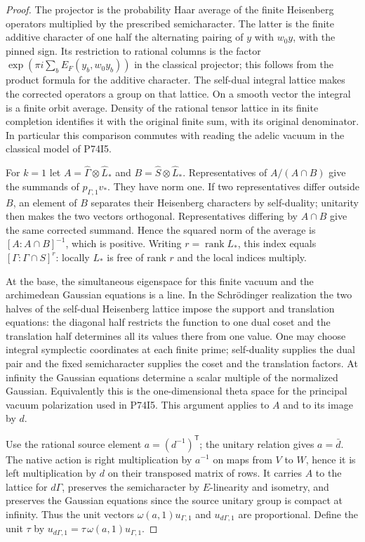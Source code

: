 \begin{proof}
The projector is the probability Haar average of the finite
Heisenberg operators multiplied by the prescribed semicharacter.
The latter is the finite additive character of one half the
alternating pairing of $y$ with $w_0 y$, with the pinned sign.
Its restriction to rational columns is the factor
$\exp(\pi i\sum_b E_F(y_b,w_0 y_b))$ in the classical projector;
this follows from the product formula for the additive character.
The self-dual integral lattice makes the corrected operators a
group on that lattice. On a smooth vector the integral is a finite
orbit average. Density of the rational tensor lattice in its finite
completion identifies it with the original finite sum, with its
original denominator. In particular this comparison commutes with
reading the adelic vacuum in the classical model of P74I5.

For $k=1$ let $A=\widehat\Gamma\otimes\widehat L_*$ and
$B=\widehat S\otimes\widehat L_*$. Representatives of
$A/(A\cap B)$ give the summands of $p_{\Gamma,1}v_*$. They
have norm one. If two representatives differ outside $B$, an
element of $B$ separates their Heisenberg characters by self-duality;
unitarity then makes the two vectors orthogonal. Representatives
differing by $A\cap B$ give the same corrected summand. Hence the
squared norm of the average is $[A:A\cap B]^{-1}$, which is
positive. Writing $r=\operatorname{rank} L_*$, this index equals
$[\Gamma:\Gamma\cap S]^r$: locally $L_*$ is free of rank $r$
and the local indices multiply.

At the base, the simultaneous eigenspace for this finite vacuum
and the archimedean Gaussian equations is a line. In the
Schr\"odinger realization the two halves of the self-dual
Heisenberg lattice impose the support and translation equations:
the diagonal half restricts the function to one dual coset and
the translation half determines all its values there from one
value. One may choose integral symplectic coordinates at each
finite prime; self-duality supplies the dual pair and the fixed
semicharacter supplies the coset and the translation factors.
At infinity the Gaussian equations determine a scalar multiple
of the normalized Gaussian. Equivalently this is the
one-dimensional theta space for the principal vacuum polarization
used in P74I5. This argument applies to $A$ and to its image by $d$.

Use the rational source element $a=(d^{-1})^{\mathsf T}$; the
unitary relation gives $a=\bar d$. The native action is right
multiplication by $a^{-1}$ on maps from $V$ to $W$, hence it is
left multiplication by $d$ on their transposed matrix of rows.
It carries $A$ to the lattice for $d\Gamma$, preserves the
semicharacter by $E$-linearity and isometry, and preserves the
Gaussian equations since the source unitary group is compact at
infinity. Thus the unit vectors $\omega(a,1)u_{\Gamma,1}$ and
$u_{d\Gamma,1}$ are proportional. Define the unit $\tau$ by
$u_{d\Gamma,1}=\tau\,\omega(a,1)u_{\Gamma,1}$.


\end{proof}
